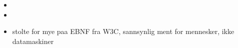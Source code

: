 \begin{itemize}
\item 
\item 
\item stolte for mye paa EBNF fra W3C, sannsynlig ment for mennesker, ikke datamaskiner
\end{itemize}